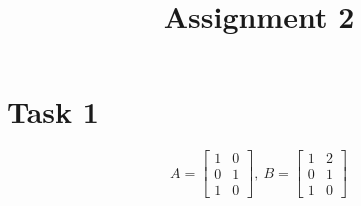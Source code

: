 \documentclass[14pt, notitlepage]{article}
\begin{document}
\title{Assignment 2}
\maketitle

\section*{Task 1}
\[
    A = \begin{bmatrix}
        1 & 0 \\
        0 & 1 \\
        1 & 0
    \end{bmatrix}, \  B = \begin{bmatrix}
        1 & 2 \\
        0 & 1 \\
        1 & 0
    \end{bmatrix}
\]
\end{document}
